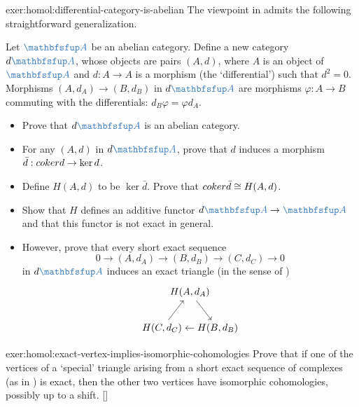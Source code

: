 \begin{exer}{}{exer:homol:differential-category-is-abelian}
  The viewpoint in
   admits the
  following straightforward generalization.

  Let $\categ{A}$ be an abelian category. Define a new category
  $d\categ{A}$, whose objects are pairs $(A, d)$, where $A$ is an
  object of $\categ{A}$ and $d : A \to A$ is a morphism (the
  `differential') such that $d^2 = 0$. Morphisms
  $(A, d_A) \to (B, d_B)$ in $d\categ{A}$ are morphisms
  $\varphi : A \to B$ commuting with the differentials:
  $d_B\varphi = \varphi d_A$.
  \begin{itemize}
  \item Prove that $d\categ{A}$ is an abelian category.
  \item For any $(A, d)$ in $d\categ{A}$, prove that $d$ induces a
    morphism $\bar d : coker d \to \ker d$.
  \item Define $H(A, d)$ to be $\ker \bar d$. Prove that
    $coker\bar d \cong H(A, d)$.
  \item Show that $H$ defines an additive functor
    $d\categ{A} \to \categ{A}$ and that this functor is not exact in
    general.
  \item However, prove that every short exact sequence
    \[
      0 \longrightarrow (A, d_A) \longrightarrow (B, d_B)
      \longrightarrow (C, d_C) \longrightarrow 0
    \]
    in $d\categ{A}$ induces an exact triangle (in the sense of
    )
    \[
      \begin{tikzpicture}[baseline=(current bounding box.center)]
        \node (A) at (1,1.3)
        {$H(A,d_A)$}; \node (C) at (0,0)
        {$H(C,d_C)$}; \node (B) at (2,0)
        {$H(B,d_B)$}; \draw[->] (A) -- (B); \draw[->] (B) -- (C);
        \draw[->] (C) -- (A);
      \end{tikzpicture}
    \]
  \end{itemize}
\end{exer}
\begin{exer}{\exerused{}}{exer:homol:exact-vertex-implies-isomorphic-cohomologies}
  Prove that if one of the vertices of a `special' triangle arising
  from a short exact sequence of complexes (as in
  ) is exact, then the other two
  vertices have isomorphic cohomologies, possibly up to a
  shift. []
\end{exer}

